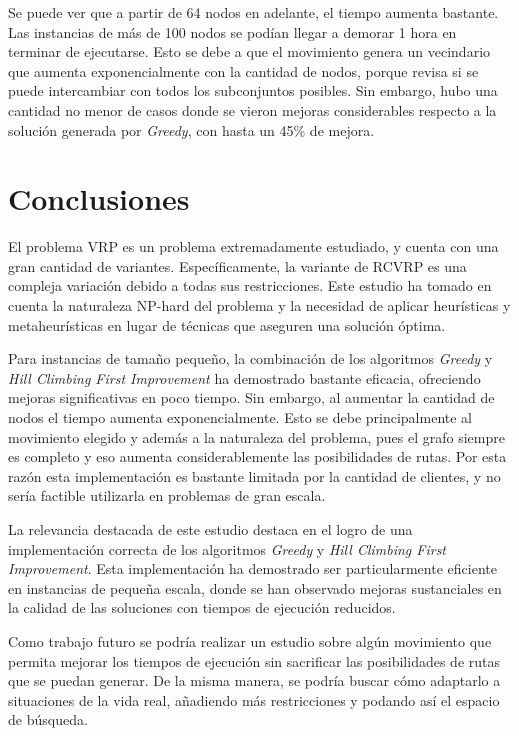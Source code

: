 \documentclass{article}
\begin{document}
    Se puede ver que a partir de 64 nodos en adelante, el tiempo aumenta bastante. Las instancias de más de 100 nodos se podían llegar a demorar 1 hora en terminar de ejecutarse. Esto se debe a que el movimiento genera un vecindario que aumenta exponencialmente con la cantidad de nodos, porque revisa si se puede intercambiar con todos los subconjuntos posibles. Sin embargo, hubo una cantidad no menor de casos donde se vieron mejoras considerables respecto a la solución generada por \textit{Greedy}, con hasta un 45\% de mejora. 
\newpage
\section{Conclusiones}
El problema VRP es un problema extremadamente estudiado, y cuenta con una gran cantidad de variantes. Específicamente, la variante de RCVRP es una compleja variación debido a todas sus restricciones. Este estudio ha tomado en cuenta la naturaleza NP-hard del problema y la necesidad de aplicar heurísticas y metaheurísticas en lugar de técnicas que aseguren una solución óptima. 

Para instancias de tamaño pequeño, la combinación de los algoritmos \textit{Greedy} y \textit{Hill Climbing First Improvement} ha demostrado bastante eficacia, ofreciendo mejoras significativas en poco tiempo. Sin embargo, al aumentar la cantidad de nodos el tiempo aumenta exponencialmente. Esto se debe principalmente al movimiento elegido y además a la naturaleza del problema, pues el grafo siempre es completo y eso aumenta considerablemente las posibilidades de rutas. Por esta razón esta implementación es bastante limitada por la cantidad de clientes, y no sería factible utilizarla en problemas de gran escala. 

La relevancia destacada de este estudio destaca en el logro de una implementación correcta de los algoritmos \textit{Greedy} y \textit{Hill Climbing First Improvement}. Esta implementación ha demostrado ser particularmente eficiente en instancias de pequeña escala, donde se han observado mejoras sustanciales en la calidad de las soluciones con tiempos de ejecución reducidos.

Como trabajo futuro se podría realizar un estudio sobre algún movimiento que permita mejorar los tiempos de ejecución sin sacrificar las posibilidades de rutas que se puedan generar. De la misma manera, se podría buscar cómo adaptarlo a situaciones de la vida real, añadiendo más restricciones y podando así el espacio de búsqueda.

\newpage

\small

\end{document}
